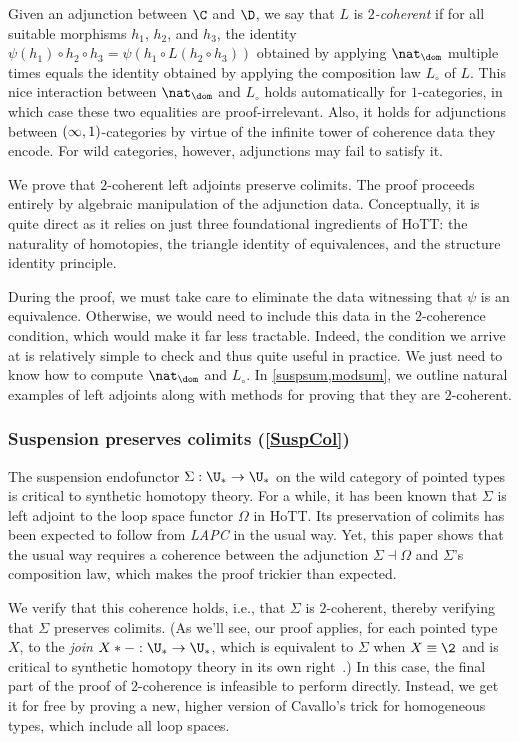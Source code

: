Given an adjunction between $\C$ and $\D$, we say that $L$ is \emph{$2$-coherent} if for all suitable morphisms $h_1$, $h_2$, and $h_3$, the identity $\psi(h_1) \circ h_2 \circ h_3 = \psi(h_1 \circ L(h_2 \circ h_3))$ obtained by applying $\nat_{\dom}$ multiple times equals the identity obtained by applying the composition law $L_{\circ}$ of $L$. 
This nice interaction between $\nat_{\dom}$ and $L_{\circ}$ holds automatically for $1$-categories, in which case these two equalities are proof-irrelevant. Also, it holds for adjunctions between $\mleft(\infty,1\mright)$-categories by virtue of the infinite tower of coherence data they encode. For wild categories, however, adjunctions may fail to satisfy it.

We prove that $2$-coherent left adjoints preserve colimits. The proof proceeds entirely by algebraic manipulation of the adjunction data. Conceptually, it is quite direct as it relies on just three foundational ingredients of HoTT: the naturality of homotopies, the triangle identity of equivalences, and the structure identity principle. 

During the proof, we must take care to eliminate the data witnessing that $\psi$ is an equivalence. Otherwise, we would need to include this data in the $2$-coherence condition, which would make it far less tractable. Indeed, the condition we arrive at is relatively simple to check and thus quite useful in practice. We just need to know how to compute $\nat_{\dom}$ and $L_{\circ}$. In \cref{suspsum,modsum}, we outline natural examples of left adjoints along with methods for proving that they are $2$-coherent.

\subsubsection{Suspension preserves colimits (\autoref{SuspCol})} \label{suspsum}

The suspension endofunctor $\Sigma : \U_{\ast} \to \U_{\ast}$ on the wild category of pointed types is  critical to synthetic homotopy theory. For a while, it has been known that $\Sigma$ is left adjoint to the loop space functor $\Omega$ in HoTT. Its preservation of colimits has been expected to follow from \emph{LAPC} in the usual way. Yet, this paper shows that the usual way requires a  coherence between the adjunction $\Sigma \dashv \Omega$ and $\Sigma$'s composition law, which makes the proof trickier than expected. 

We verify that this coherence holds, i.e., that $\Sigma$ is $2$-coherent, thereby verifying that $\Sigma$ preserves colimits. (As we'll see, our proof applies, for each pointed type $X$, to the \emph{join} $X \ast {-} : \U_{\ast} \to \U_{\ast}$, which is equivalent to $\Sigma$ when $X \equiv \2$ and is critical to synthetic homotopy theory in its own right~\cite{brunthesis,rijkejoin}.) In this case, the final part of the proof of $2$-coherence is infeasible to perform  directly. Instead, we get it for free by proving a new, higher version of Cavallo's trick for homogeneous types, which include all loop spaces. 


